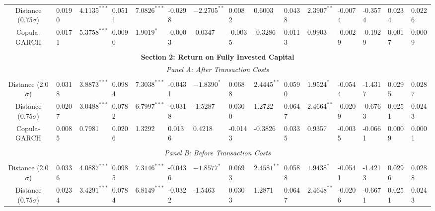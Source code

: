 \documentclass[a4paper]{article}
\begin{document}
\begin{sidewaystable}
\begin{threeparttable}[H]
\begin{tabularx}{\textwidth}{@{\extracolsep{\fill}}lllllllllllllll@{}}
				\multicolumn{1}{c}{Distance (0.75$\sigma$)} & 0.0190 & $4.1135^{***}$ & 0.0511 & $7.0826^{***}$ & -0.0298 & $-2.2705^{**}$ & 0.0082 & 0.6003 & 0.0438 & $2.3907^{**}$ & -0.0074 & -0.3574 & 0.0234 & 0.0226 \\
				\multicolumn{1}{c}{Copula-GARCH} & 0.0171 & $5.3758^{***}$ & 0.0090 & $1.9019^{*}$ & -0.0003 & -0.0347 & -0.0035 & -0.3286 & 0.0113 & 0.9903 & -0.0029 & -0.1929 & 0.0017 & 0.0009 \\
				&       &       &       &       &       &       &       &       &       &       &       &       &       &  \\
				\midrule
				\multicolumn{15}{c}{\textbf{Section 2: Return on Fully Invested Capital}} \\
				\multicolumn{15}{c}{\textit{Panel A: After Transaction Costs}} \\
				&       &       &       &       &       &       &       &       &       &       &       &       &       &  \\
				\multicolumn{1}{c}{Distance (2.0$\sigma$)} & 0.0318 & $3.8873^{***}$ & 0.0984 & $7.3038^{***}$ & -0.0431 & $-1.8390^{*}$ & 0.0688 & $2.4445^{**}$ & 0.0590 & $1.9524^{*}$ & -0.0544 & -1.4317 & 0.0295 & 0.0287 \\
				\multicolumn{1}{c}{Distance (0.75$\sigma$)} & 0.0207 & $3.0488^{***}$ & 0.0782 & $6.7997^{***}$ & -0.0318 & -1.5287 & 0.0300 & 1.2722 & 0.0647 & $2.4664^{**}$ & -0.0209 & -0.6763 & 0.0251 & 0.0243  \\
				\multicolumn{1}{c}{Copula-GARCH} & 0.0085 & 0.7981 & 0.0206 & 1.3292 & 0.0136 & 0.4218 & -0.0143 & -0.3826 & 0.0335 & 0.9357 & -0.0035 & -0.0661 & 0.0009 & 0.0001 \\
				&       &       &       &       &       &       &       &       &       &       &       &       &       &  \\
				\multicolumn{15}{c}{\textit{Panel B: Before Transaction Costs}} \\
				&       &       &       &       &       &       &       &       &       &       &       &       &       &  \\
				\multicolumn{1}{c}{Distance (2.0$\sigma$)} & 0.0336 & $4.0887^{***}$ & 0.0985 & $7.3146^{***}$ & -0.0436 & $-1.8577^{*}$ & 0.0693 & $2.4581^{**}$ & 0.0588 & $1.9438^{*}$ & -0.0541 & -1.4213 & 0.0296 & 0.0288 \\
				\multicolumn{1}{c}{Distance (0.75$\sigma$)} & 0.0234 & $3.4291^{***}$ & 0.0784 & $6.8149^{***}$ & -0.0322 & -1.5463 & 0.0303 & 1.2871 & 0.0647 & $2.4648^{**}$ & -0.0206 & -0.6671 & 0.0251 & 0.0243 \\

\end{tabularx}
\end{threeparttable}
\end{sidewaystable}
\end{document}
